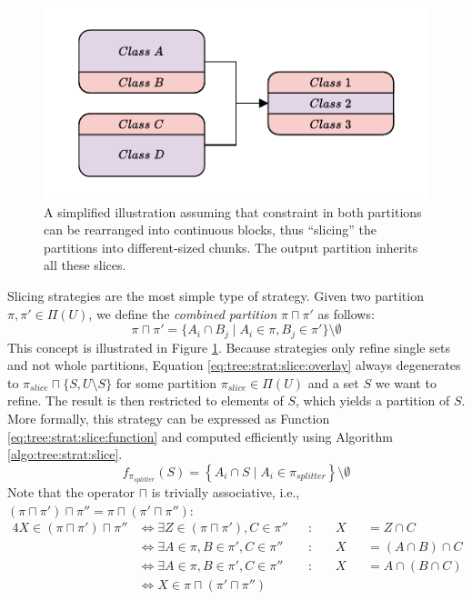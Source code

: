 			\begin{figure}[ht!]
				\centering
				\includegraphics[scale=1.2]{Bilder/DrawIO/strat_slicing_pdf}
				\caption{A simplified illustration assuming that constraint in both partitions can be rearranged into continuous blocks, thus \enquote{slicing} the partitions into different-sized chunks. The output partition inherits all these slices.}
				\label{fig:tree:strat:slice}
			\end{figure}

			Slicing strategies are the most simple type of strategy.
			Given two partition $\pi, \pi' \in \Pi(U)$, we define the \textit{combined partition} $\pi \sqcap \pi'$ as follows:
			\begin{equation}
				\label{eq:tree:strat:slice:overlay}
				\pi \sqcap \pi' = \{ A_i \cap B_j \mid A_i \in \pi, B_j \in \pi' \} \setminus \emptyset
			\end{equation}
			This concept is illustrated in Figure \ref{fig:tree:strat:slice}.
			Because strategies only refine single sets and not whole partitions, Equation \ref{eq:tree:strat:slice:overlay} always degenerates to $\pi_{slice} \sqcap \{ S, U \setminus S \}$ for some partition $\pi_{slice} \in \Pi(U)$ and a set $S$ we want to refine.
			The result is then restricted to elements of $S$, which yields a partition of $S$.
			More formally, this strategy can be expressed as Function \ref{eq:tree:strat:slice:function} and computed efficiently using Algorithm \ref{algo:tree:strat:slice}.
			\begin{equation}
			\label{eq:tree:strat:slice:function}
				f_{\pi_{splitter}}(S) = \left\{ A_i \cap S \mid A_i \in \pi_{splitter} \right\} \setminus \emptyset
			\end{equation}
			Note that the operator $\sqcap$ is trivially associative, i.e., $(\pi \sqcap \pi') \sqcap \pi'' = \pi \sqcap (\pi' \sqcap \pi'')$:
			\begin{alignat*}{4}
				X \in (\pi \sqcap \pi') \sqcap \pi'' &\iff \exists Z \in (\pi \sqcap \pi'), C \in \pi'' && : \; && X && ={} Z \cap C \\
				&\iff \exists A \in \pi, B \in \pi', C \in \pi''&& : \; && X && ={} (A \cap B) \cap C \\
				&\iff \exists A \in \pi, B \in \pi', C \in \pi''&& : \; && X && ={} A \cap (B \cap C) \\
				&\iff  X \in \pi \sqcap (\pi' \sqcap \pi'')
			\end{alignat*}

